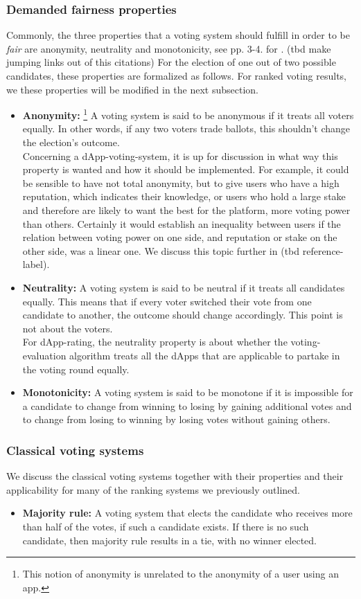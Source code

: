 \subsubsection{Demanded fairness properties}
Commonly, the three properties that a voting system should fulfill in order to be \textit{fair} are anonymity, neutrality and monotonicity, see pp. 3-4. for \cite{voting}. (tbd make jumping links out of this citations) For the election of one out of two possible candidates, these properties are formalized as follows. For ranked voting results, we these properties will be modified in the next subsection.
\begin{itemize}
\item {\textbf{Anonymity:}
\footnote{This notion of anonymity is unrelated to the anonymity of a user using an app.}}
A voting system is said to be anonymous if it treats all voters equally. In other words, if any two voters trade ballots, this shouldn't change the election's outcome. \\
Concerning a dApp-voting-system, it is up for discussion in what way this property is wanted and how it should be implemented. For example, it could be sensible to have not total anonymity, but to give users who have a high reputation, which indicates their knowledge, or users who hold a large stake and therefore are likely to want the best for the platform, more voting power than others. Certainly it would establish an inequality between users if the relation between voting power on one side, and reputation or stake on the other side, was a linear one. We discuss this topic further in (tbd reference-label).
\item {\textbf{Neutrality:}} A voting system is said to be neutral if it treats all candidates equally. This means that if every voter switched their vote from one candidate to another, the outcome should change accordingly. 
This point is not about the voters.\\ 
For dApp-rating, the neutrality property is about whether the voting-evaluation algorithm treats all the dApps that are applicable to partake in the voting round equally. 
\item {\textbf{Monotonicity:}} A voting system is said to be monotone if it is impossible for a candidate to change from winning to losing by gaining additional votes and to change from losing to winning by losing votes without gaining others.
\end{itemize} 

\subsubsection{Classical voting systems}
We discuss the classical voting systems together with their properties and their applicability for many of the ranking systems we previously outlined.
\begin{itemize}[leftmargin = 0pt]
\item {\textbf{Majority rule:}} A voting system that elects the candidate who receives more than half of the votes, if such a candidate exists. If there is no such candidate, then majority rule results in a tie, with no winner elected.
\end{itemize}

